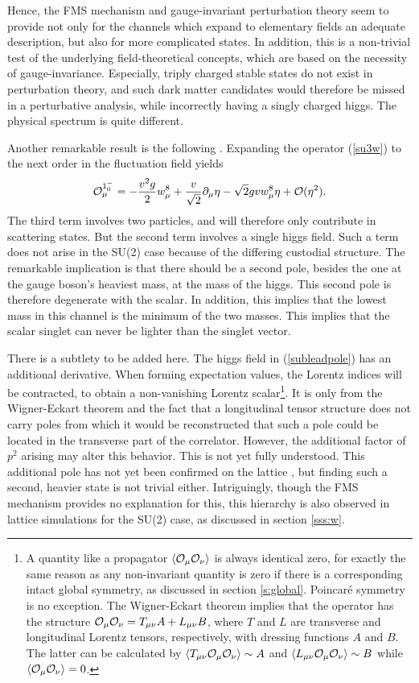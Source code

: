 \documentclass[final,12pt]{article}
\newcommand*{\no}{\noindent}
\newcommand*{\be}{\begin{equation}}
\newcommand*{\ee}{\end{equation}}
\newcommand*{\pd}{\partial}
\newcommand*{\pdm}{\pd_{\mu}}
\newcommand*{\pref}[1]{(\ref{#1})}
\newcommand*{\mn}{{\mu\nu}}
\newcommand*{\1}{1\!\!\!\bot}
\newcommand*{\la}{\left\langle}
\newcommand*{\ra}{\right\rangle}
\newcommand*{\op}{{\cal O}}
\begin{document}
Hence, the FMS mechanism and gauge-invariant perturbation theory seem to provide not only for the channels which expand to elementary fields an adequate description, but also for more complicated states. In addition, this is a non-trivial test of the underlying field-theoretical concepts, which are based on the necessity of gauge-invariance. Especially, triply charged stable states do not exist in perturbation theory, and such dark matter candidates would therefore be missed in a perturbative analysis, while incorrectly having a singly charged higgs. The physical spectrum is quite different.

Another remarkable result is the following \cite{Maas:2017xzh}. Expanding the operator \pref{su3w} to the next order in the fluctuation field yields
\be
\op_\mu^{1^{-}_0}=-\frac{v^{2}g}{2}w_\mu^8+\frac{v}{\sqrt{2}}\pdm\eta-\sqrt{2}gv w_{\mu}^8\eta+\mathcal{O}(\eta^{2}).\label{subleadpole}
\ee
\no The third term involves two particles, and will therefore only contribute in scattering states. But the second term involves a single higgs field. Such a term does not arise in the SU(2) case because of the differing custodial structure. The remarkable implication is that there should be a second pole, besides the one at the gauge boson's heaviest mass, at the mass of the higgs. This second pole is therefore degenerate with the scalar. In addition, this implies that the lowest mass in this channel is the minimum of the two masses. This implies that the scalar singlet can never be lighter than the singlet vector.

There is a subtlety to be added here. The higgs field in \pref{subleadpole} has an additional derivative. When forming expectation values, the Lorentz indices will be contracted, to obtain a non-vanishing Lorentz scalar\footnote{A quantity like a propagator $\la\op_\mu\op_\nu\ra$ is always identical zero, for exactly the same reason as any non-invariant quantity is zero if there is a corresponding intact global symmetry, as discussed in section \ref{s:global}. Poincar\'e symmetry is no exception. The Wigner-Eckart theorem implies that the operator has the structure $\op_\mu\op_\nu=T_\mn A+L_\mn B$, where $T$ and $L$ are transverse and longitudinal Lorentz tensors, respectively, with dressing functions $A$ and $B$. The latter can be calculated by $\la T_\mn\op_\mu\op_\nu\ra\sim A$ and $\la L_\mn\op_\mu\op_\nu\ra\sim B$ while $\la\op_\mu\op_\nu\ra=0$.}. It is only from the Wigner-Eckart theorem and the fact that a longitudinal tensor structure does not carry poles from which it would be reconstructed that such a pole could be located in the transverse part of the correlator. However, the additional factor of $p^2$ arising may alter this behavior. This is not yet fully understood. This additional pole has not yet been confirmed on the lattice \cite{Maas:unpublishedtoerek}, but finding such a second, heavier state is not trivial either. Intriguingly, though the FMS mechanism provides no explanation for this, this hierarchy is also observed in lattice simulations for the SU(2) case, as discussed in section \ref{sss:w}.
\end{document}
